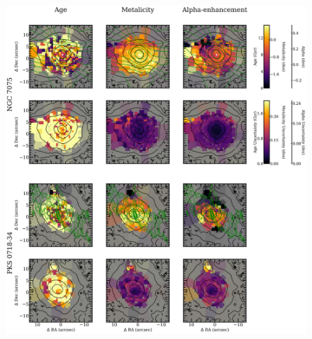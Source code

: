 		\begin{figure}
			\centering
			\includegraphics[height=0.63\textheight]{chapter4/vimos/pop4.png}
		\end{figure}

